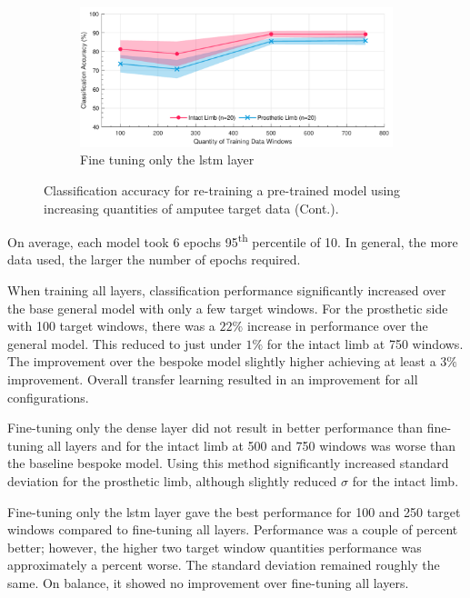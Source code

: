\begin{figure}[t]\ContinuedFloat
    \centering
    \begin{subfigure}{\textwidth}
        \includegraphics[width=\textwidth]{content/6-Amputee/ch6_frozen_dense_layer_accuracy.pdf}
        \caption{Fine tuning only the \acrshort{lstm} layer}
    \end{subfigure}
    \caption[]{Classification accuracy for re-training a pre-trained model using increasing quantities of amputee target data (Cont.).}
\end{figure}

On average, each model took 6 epochs 95\textsuperscript{th} percentile of 10. In general, the more data used, the larger the number of epochs required.

When training all layers, classification performance significantly increased over the base general model with only a few target windows. For the prosthetic side with 100 target windows, there was a $22\%$ increase in performance over the general model. This reduced to just under $1\%$ for the intact limb at 750 windows. The improvement over the bespoke model slightly higher achieving at least a $3\%$ improvement. Overall transfer learning resulted in an improvement for all configurations.

Fine-tuning only the dense layer did not result in better performance than fine-tuning all layers and for the intact limb at 500 and 750 windows was worse than the baseline bespoke model. Using this method significantly increased standard deviation for the prosthetic limb, although slightly reduced $\sigma$ for the intact limb.

Fine-tuning only the \acrshort{lstm} layer gave the best performance for 100 and 250 target windows compared to fine-tuning all layers. Performance was a couple of percent better; however, the higher two target window quantities performance was approximately a percent worse. The standard deviation remained roughly the same. On balance, it showed no improvement over fine-tuning all layers.

